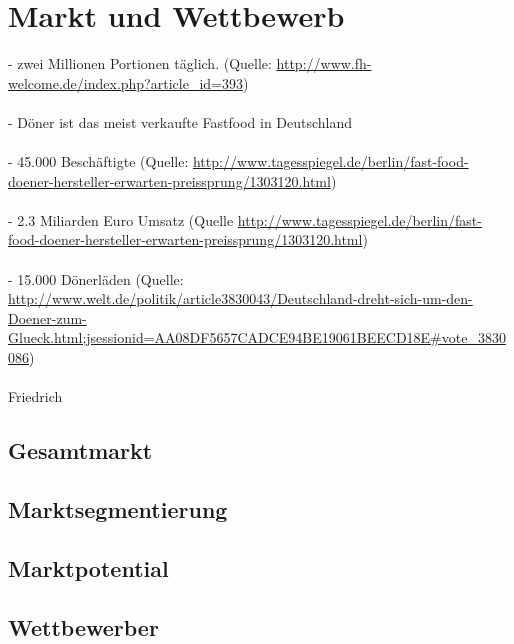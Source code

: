
\section{Markt und Wettbewerb}
- zwei Millionen Portionen täglich. (Quelle: \url{http://www.fh-welcome.de/index.php?article_id=393})\\\\
- Döner ist das meist verkaufte Fastfood in Deutschland\\\\
- 45.000 Beschäftigte (Quelle: \url{http://www.tagesspiegel.de/berlin/fast-food-doener-hersteller-erwarten-preissprung/1303120.html})\\\\
- 2.3 Miliarden Euro Umsatz (Quelle \url{http://www.tagesspiegel.de/berlin/fast-food-doener-hersteller-erwarten-preissprung/1303120.html})\\\\
- 15.000 Dönerläden (Quelle: \url{http://www.welt.de/politik/article3830043/Deutschland-dreht-sich-um-den-Doener-zum-Glueck.html;jsessionid=AA08DF5657CADCE94BE19061BEECD18E#vote_3830086})\\\\
Friedrich

\subsection{Gesamtmarkt}
\subsection{Marktsegmentierung}
\subsection{Marktpotential}
\subsection{Wettbewerber}